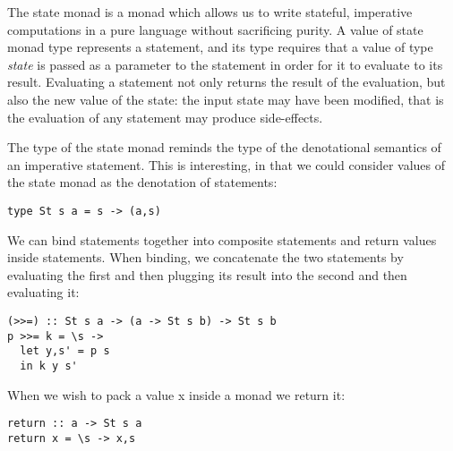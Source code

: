 The state monad \cite{1_1,1_2,1_3,1_4,1_5} is a monad which allows us to write stateful, imperative computations in a pure language without sacrificing purity. A value of state monad type represents a statement, and its type requires that a value of type \emph{state} is passed as a parameter to the statement in order for it to evaluate to its result. Evaluating a statement not only returns the result of the evaluation, but also the new value of the state: the input state may have been modified, that is the evaluation of any statement may produce side-effects.

The type of the state monad reminds the type of the denotational semantics of an imperative statement. This is interesting, in that we could consider values of the state monad as the denotation of statements:

\begin{lstlisting}
type St s a = s -> (a,s)
\end{lstlisting}

We can bind statements together into composite statements and return values inside statements. When binding, we concatenate the two statements by evaluating the first and then plugging its result into the second and then evaluating it:

\begin{lstlisting}
(>>=) :: St s a -> (a -> St s b) -> St s b
p >>= k = \s ->
  let y,s' = p s
  in k y s'
\end{lstlisting}

When we wish to pack a value x inside a monad we return it:

\begin{lstlisting}
return :: a -> St s a
return x = \s -> x,s
\end{lstlisting}
